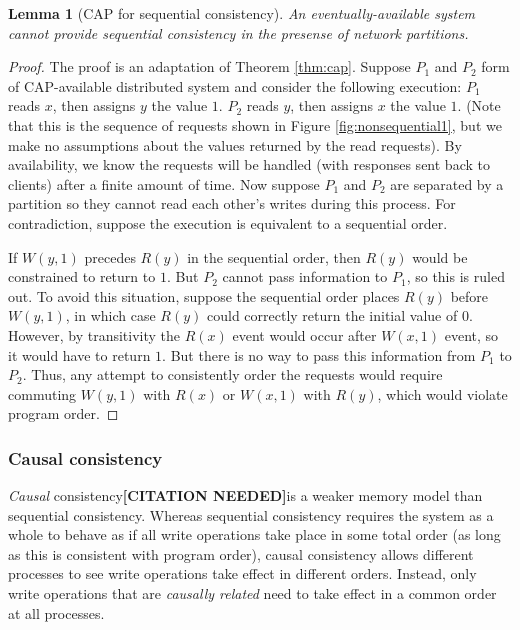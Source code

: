\documentclass[]             %
{NASA}                       %
\newtheorem{lemma}[theorem]{Lemma}
\theoremstyle{definition}
\newcommand{\citationneeded}{\textbf{[CITATION NEEDED]}}
\begin{document}
\begin{lemma}[CAP for sequential consistency]
  \label{thm:cap-sequential}
  An eventually-available system cannot provide sequential consistency in the presense of network partitions.
\end{lemma}
\begin{proof}
  The proof is an adaptation of Theorem \ref{thm:cap}. Suppose $P_1$ and
  $P_2$ form of CAP-available distributed system and consider the
  following execution: $P_1$ reads $x$, then assigns $y$ the value
  $1$. $P_2$ reads $y$, then assigns $x$ the value $1$. (Note that this
  is the sequence of requests shown in Figure \ref{fig:nonsequential1},
  but we make no assumptions about the values returned by the read
  requests). By availability, we know the requests will be handled (with
  responses sent back to clients) after a finite amount of time. Now
  suppose $P_1$ and $P_2$ are separated by a partition so they cannot
  read each other's writes during this process. For contradiction,
  suppose the execution is equivalent to a sequential order.

  If $W(y,1)$ precedes $R(y)$ in the sequential order, then $R(y)$ would
  be constrained to return to $1$. But $P_2$ cannot pass information to
  $P_1$, so this is ruled out. To avoid this situation, suppose the
  sequential order places $R(y)$ before $W(y,1)$, in which case $R(y)$
  could correctly return the initial value of $0$. However, by
  transitivity the $R(x)$ event would occur after $W(x,1)$ event, so it
  would have to return $1$. But there is no way to pass this information
  from $P_1$ to $P_2$. Thus, any attempt to consistently order the
  requests would require commuting $W(y,1)$ with $R(x)$ or $W(x,1)$ with
  $R(y)$, which would violate program order.
\end{proof}

\subsubsection{Causal consistency}
\label{causal-consistency}

\emph{Causal} consistency\citationneeded is a weaker memory model than
sequential consistency. Whereas sequential consistency requires the
system as a whole to behave as if all write operations take place in
some total order (as long as this is consistent with program order),
causal consistency allows different processes to see write operations
take effect in different orders. Instead, only write operations that
are \emph{causally related} need to take effect in a common order
at all processes.
\end{document}
